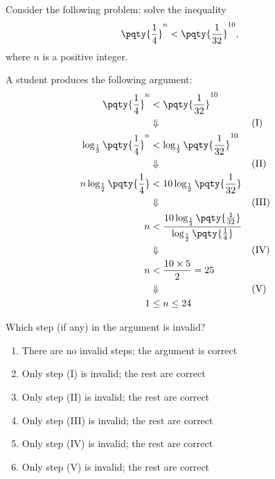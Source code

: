 \documentclass{article}
\begin{document}
\begin{example}[TMUA 2017 P2 Q18]
    Consider the following problem: solve the inequality
    \[
        \pqty{\frac{1}{4}}^n < \pqty{\frac{1}{32}}^{10},
    \]
    where \(n\) is a positive integer.

    A student produces the following argument:
    \begin{align*}
        \pqty{\frac{1}{4}}^n &< \pqty{\frac{1}{32}}^{10} \\
        &\Downarrow && \text{(I)} \\
        \log_{\frac{1}{2}} \pqty{\frac{1}{4}}^n &< \log_{\frac{1}{2}} \pqty{\frac{1}{32}}^{10} \\
        &\Downarrow && \text{(II)} \\
        n \log_{\frac{1}{2}} \pqty{\frac{1}{4}} &< 10 \log_{\frac{1}{2}} \pqty{\frac{1}{32}} \\
        &\Downarrow && \text{(III)} \\
        n &< \frac{10 \log_{\frac{1}{2}} \pqty{\frac{1}{32}}}{\log_{\frac{1}{2}} \pqty{\frac{1}{4}}} \\
        &\Downarrow && \text{(IV)} \\
        n &< \frac{10 \times 5}{2} = 25 \\
        &\Downarrow && \text{(V)} \\
        1 &\leq n \leq 24
    \end{align*}

    Which step (if any) in the argument is invalid?

    \begin{enumerate}[label=\Alph*.]
        \item There are no invalid steps; the argument is correct
        \item Only step (I) is invalid; the rest are correct
        \item Only step (II) is invalid; the rest are correct
        \item Only step (III) is invalid; the rest are correct
        \item Only step (IV) is invalid; the rest are correct
        \item Only step (V) is invalid; the rest are correct
    \end{enumerate}
\end{example}
\end{document}

